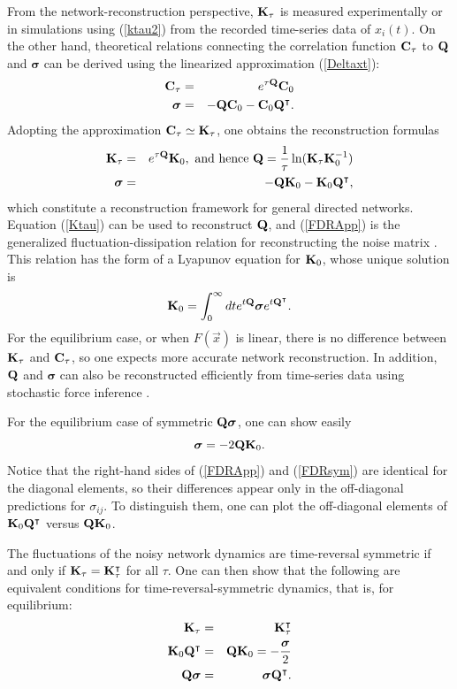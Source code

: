 From the network-reconstruction perspective, ${\bf K}_\tau$ is measured experimentally or in simulations using (\ref{ktau2}) from the recorded time-series data of $x_i(t)$. On the other hand, theoretical relations connecting the correlation function ${\bf C}_\tau$ to ${\bf Q}$ and $\boldsymbol{\sigma}$ can be derived using the linearized approximation (\ref{Deltaxt}):
\begin{eqnarray}
  {\bf C}_\tau&=&e^{\tau{\bf Q}} {\bf C}_0\\
  \boldsymbol{\sigma}&=&-{\bf Q}{\bf C}_0-{\bf C}_0 {\bf Q}^\intercal.\label{QCCQ}
\end{eqnarray}
Adopting the approximation ${\bf C}_\tau \simeq {\bf K}_\tau$, one obtains the reconstruction formulas
\begin{eqnarray}
  {\bf K}_\tau&=&e^{\tau{\bf Q}} {\bf K}_0,\hbox{ and hence }  {\bf Q}=\frac{1}{\tau}\ln ( {\bf K}_\tau{\bf K}_0^{-1})\label{Ktau}\\
  \boldsymbol{\sigma}&=&-{\bf Q}{\bf K}_0-{\bf K}_0 {\bf Q}^\intercal,\label{FDRApp}
\end{eqnarray}
which constitute a reconstruction framework for general directed networks. Equation (\ref{Ktau}) can be used to reconstruct ${\bf Q}$, and (\ref{FDRApp}) is the generalized fluctuation-dissipation relation for reconstructing the noise matrix \cite{lai2026steadystate}. This relation has the form of a Lyapunov equation for ${\bf K}_0$, whose unique solution is
\begin{equation}
{\bf K}_0=\int_0^\infty dt e^{t{\bf Q}} \boldsymbol{\sigma}e^{t{\bf Q}^\intercal}.\label{Lynsoln}
\end{equation}
For the equilibrium case, or when ${ F}({\vec x})$ is linear, there is no difference between ${\bf K}_\tau$ and ${\bf C}_\tau$, so one expects more accurate network reconstruction. In addition, ${\bf Q}$ and $\boldsymbol{\sigma}$ can also be reconstructed efficiently from time-series data using stochastic force inference \cite{ChengLai2022}.


For the equilibrium case of symmetric ${\bf Q}\boldsymbol{\sigma}$, one can show easily
\begin{equation}
  \boldsymbol{\sigma}=-2   {\bf Q} {\bf K}_0.\label{FDRsym}
  \end{equation}
Notice that the right-hand sides of (\ref{FDRApp}) and (\ref{FDRsym}) are identical for the diagonal elements, so their differences appear only in the off-diagonal predictions for $\sigma_{ij}$. To distinguish them, one can plot the off-diagonal elements of ${\bf K}_0 {\bf Q}^\intercal$ versus ${\bf Q} {\bf K}_0$.

The fluctuations of the noisy network dynamics are time-reversal symmetric if and only if ${\bf K}_\tau= {\bf K}_\tau^\intercal$ for all $\tau$. One can then show that the following are equivalent conditions for time-reversal-symmetric dynamics, that is, for equilibrium:
\begin{eqnarray}
     {\bf K}_\tau&=& {\bf K}_\tau^\intercal\\
     {\bf K}_0 {\bf Q}^\intercal&=& {\bf Q} {\bf K}_0=-\frac{\boldsymbol{\sigma}}{2}\\
   {\bf Q} \boldsymbol{\sigma} &=&  \boldsymbol{\sigma}{\bf Q}^\intercal.
\end{eqnarray}
